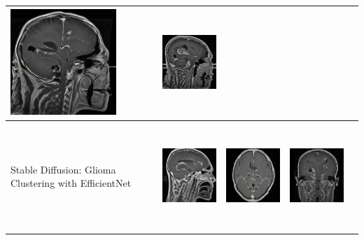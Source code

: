 \begin{table}[H]
\begin{tabularx}{\linewidth}{@{}>{\centering\arraybackslash}m{3cm}>{\centering\arraybackslash}X>{\centering\arraybackslash}X>{\centering\arraybackslash}X>{\centering\arraybackslash}X@{}}
\includegraphics[valign=M,width=\linewidth,height=4cm,keepaspectratio]{main/content/images/brain_dreambooth_comparison/synthetic/1.png} & 
\includegraphics[valign=M,width=\linewidth,height=4cm,keepaspectratio]{main/content/images/brain_dreambooth_comparison/synthetic/2.png} \\
\midrule
Stable Diffusion: Glioma Clustering with EfficientNet &
\includegraphics[valign=M,width=\linewidth,height=4cm,keepaspectratio]{main/content/images/brain_dreambooth_comparison/cluster/cluster_3_image15.png} & 
\includegraphics[valign=M,width=\linewidth,height=4cm,keepaspectratio]{main/content/images/brain_dreambooth_comparison/cluster/cluster_0_image43.png} & 
\includegraphics[valign=M,width=\linewidth,height=4cm,keepaspectratio]{main/content/images/brain_dreambooth_comparison/cluster/cluster_2_image19.png} \\

\end{tabularx}
\end{table}
